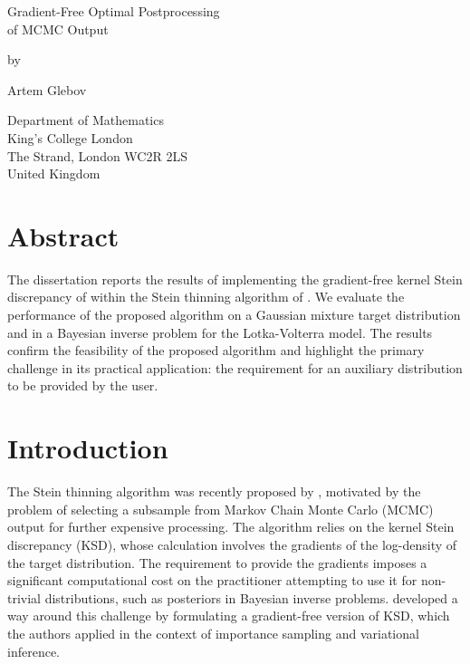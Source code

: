 \documentclass[11pt,a4paper]{report}
\date{}
\begin{document}



\thispagestyle{empty}
\begin{center}
{\huge
Gradient-Free Optimal Postprocessing \\
of MCMC Output

\bigskip
\bigskip

by
\bigskip
\bigskip

Artem Glebov
}
\end{center}
\vfill

\begin{center}
{\large
Department of Mathematics\\
King's College London\\
The Strand, London WC2R 2LS\\
United Kingdom\\
\medskip

}
\end{center}
\bigskip


\newpage
\setcounter{page}{1}
\restoregeometry

\chapter*{Abstract}

The dissertation reports the results of implementing the gradient-free kernel Stein discrepancy of \cite{fisherGradientFreeKernelStein2024} within the Stein thinning algorithm of \cite{riabizOptimalThinningMCMC2022}. We evaluate the performance of the proposed algorithm on a Gaussian mixture target distribution and in a Bayesian inverse problem for the Lotka-Volterra model. The results confirm the feasibility of the proposed algorithm and highlight the primary challenge in its practical application: the requirement for an auxiliary distribution to be provided by the user.


\tableofcontents


\chapter*{Introduction}

The Stein thinning algorithm was recently proposed by \cite{riabizOptimalThinningMCMC2022}, motivated by the problem of selecting a subsample from Markov Chain Monte Carlo (MCMC) output for further expensive processing. The algorithm relies on the kernel Stein discrepancy (KSD), whose calculation involves the gradients of the log-density of the target distribution. The requirement to provide the gradients imposes a significant computational cost on the practitioner attempting to use it for non-trivial distributions, such as posteriors in Bayesian inverse problems. \cite{fisherGradientFreeKernelStein2024} developed a way around this challenge by formulating a gradient-free version of KSD, which the authors applied in the context of importance sampling and variational inference.
\end{document}
